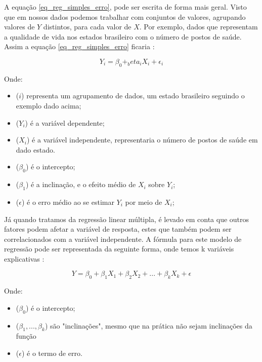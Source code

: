 \documentclass[
    12pt,               %
    openright,          %
    oneside,            %
    a4paper,            %
    english,            %
    brazil              %
    ]{abntex2}
\begin{document}
A equação \ref{eq_reg_simples_erro}, pode ser escrita de forma mais geral. Visto que em nossos dados
podemos trabalhar com conjuntos de valores, agrupando valores de $Y$ distintos, para cada valor de $X$.
Por exemplo, dados que representam a qualidade de vida nos estados brasileiro com o número de postos 
de saúde. Assim a equação \ref{eq_reg_simples_erro} ficaria \cite{modelos_regressao_linear}:

\begin{equation}
    \label{eq_reg_simples_geral}
    Y_i = \beta_0 + _beta_iX_i + \epsilon_i
\end{equation}

Onde:
\begin{itemize}
    \item ($i$) representa um agrupamento de dados, um estado brasileiro seguindo o exemplo dado acima;
    \item ($Y_i$) é a variável dependente;
    \item ($X_i$) é a variável independente, representaria o número de postos de saúde em dado estado.
    \item ($\beta_0$) é o intercepto;
    \item ($\beta_1$) é a inclinação, e o efeito médio de $X_i$ sobre $Y_i$;
    \item ($\epsilon$) é o erro médio ao se estimar $Y_i$ por meio de $X_i$;
\end{itemize}

Já quando tratamos da regressão linear múltipla, é levado em conta que outros fatores podem afetar a 
variável de resposta, estes que também podem ser correlacionados com a variável independente. A fórmula 
para este modelo de regressão pode ser representada da seguinte forma, onde temos k variáveis 
explicativas \cite{modelos_regressao_linear}:

\begin{equation}
    \label{rq_reg_multipla}
    Y = \beta_0 + \beta_1X_1 + \beta_2X_2 + ... + \beta_kX_k + \epsilon
\end{equation}

Onde:
\begin{itemize}
    \item ($\beta_0$) é o intercepto;
    \item ($\beta_1,...,\beta_k$) são "inclinações", mesmo que na prática não sejam inclinações da função
    \item ($\epsilon$) é o termo de erro.
\end{itemize}
\end{document}
